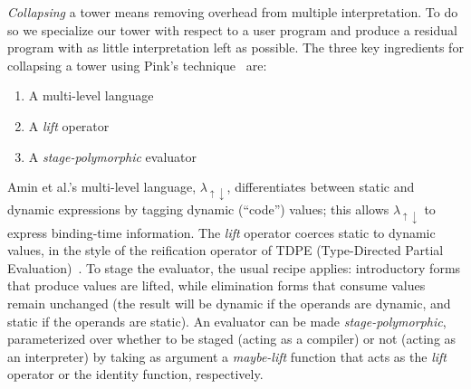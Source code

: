 \documentclass[sigplan,anonymous,review]{acmart}
\newcommand{\mslang}{$\lambda_{\uparrow\downarrow}$}
\theoremstyle{definition}
\begin{document}
\textit{Collapsing} a tower means removing overhead from multiple interpretation. To do so we specialize our tower with respect to a user program and produce a residual program with as little interpretation left as possible. The three key ingredients for collapsing a tower using Pink's technique~\cite{amin2017collapsing} are:
\begin{enumerate}
    \item A multi-level language
    \item A \textit{lift} operator
    \item A \textit{stage-polymorphic} evaluator
\end{enumerate}
Amin et al.'s multi-level language, \mslang, differentiates between
static and dynamic expressions by tagging dynamic (``code'') values;
this allows \mslang{} to express binding-time information. The
\textit{lift} operator coerces static to dynamic values, in the style
of the reification operator of TDPE (Type-Directed Partial Evaluation)~\cite{danvy1999type}.
To stage the evaluator, the usual recipe applies: introductory forms that
produce values are lifted, while elimination forms that consume values
remain unchanged (the result will be dynamic if the operands are
dynamic, and static if the operands are static). An evaluator can be
made \textit{stage-polymorphic}, parameterized over whether to be
staged (acting as a compiler) or not (acting as an interpreter) by
taking as argument a \textit{maybe-lift} function that acts as the
\textit{lift} operator or the identity function, respectively.
\end{document}
